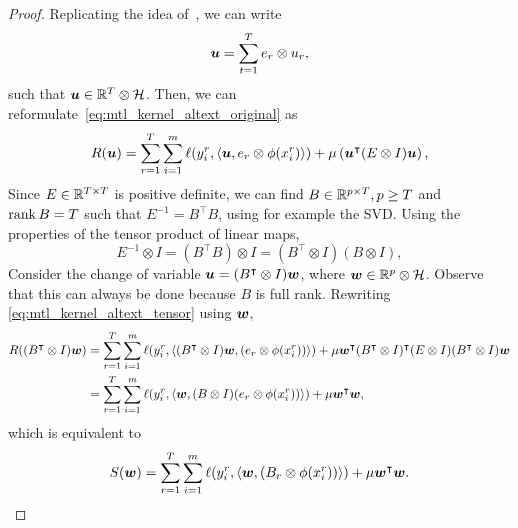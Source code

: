 \begin{proof}
    Replicating the idea of~\cite{EvgeniouMP05}, we can write
$$ \bm{u} = \sum_{t=1}^T e_r \otimes u_r ,$$
such that $\bm{u} \in \mathbb{R}^T \otimes \mathcal{H}$. Then, we can reformulate~\eqref{eq:mtl_kernel_altext_original} as
\begin{equation}
    \label{eq:mtl_kernel_altext_tensor}
    \begin{aligned}
        &R(\myvec{u}) = \sum_{r=1}^{\ntasks} \sum_{i=1}^\npertask \lossf(y_i^r, \dotp{\myvec{u}}{e_r \otimes \phi(x_i^r)}) + \mu \left(  \myvec{u}^\intercal (E \otimes I) \myvec{u} \right),\\
    \end{aligned}
\end{equation}
Since ${E} \in \mathbb{R}^{T \times T}$ is positive definite, we can find $B \in \mathbb{R}^{p \times T}, p \geq T$ and $\operatorname{rank}{B} = T$ such that $E^{-1} = 
{B^\intercal} {B}$, using for example the SVD. 
% 
Using the properties of the tensor product of linear maps,  $$ E^{-1} \otimes I = (B^\intercal B) \otimes I = (B^\intercal \otimes I) (B \otimes I),$$
%
Consider the change of variable $\bm{u} = (B^\intercal \otimes I)\bm{w}$, where $\bm{w} \in \mathbb{R}^p \otimes \mathcal{H}$. Observe that this can always be done because 
$B$ is full rank. Rewriting \eqref{eq:mtl_kernel_altext_tensor} using $\bm{w}$,
\begin{equation}
    \nonumber
    \begin{aligned}
        R((B^\intercal \otimes I) \bm{w}) &= \sum_{r=1}^{T} \sum_{i=1}^m \ell(y_i^r, \left\langle (B^\intercal \otimes I) \bm{w},  (e_r \otimes \phi(x_i^r)) \right\rangle) + \mu  \bm{w}^\intercal (B^\intercal \otimes I)^\intercal (E \otimes I) (B^\intercal \otimes I)\bm{w} \\
        &= \sum_{r=1}^{T} \sum_{i=1}^m \ell(y_i^r, \left\langle \bm{w}, (B \otimes I) (e_r \otimes \phi(x_i^r)) \right\rangle) + \mu  \bm{w}^\intercal \bm{w} ,\\
    \end{aligned}
\end{equation}
which is equivalent to
\begin{equation}
    \nonumber
    \begin{aligned}
        &S(\bm{w}) = \sum_{r=1}^{T} \sum_{i=1}^m \ell(y_i^r, \left\langle \bm{w}, (B_r \otimes \phi(x_i^r)) \right\rangle) + \mu  \bm{w}^\intercal \bm{w} .\\
    \end{aligned}
\end{equation}


\end{proof}
